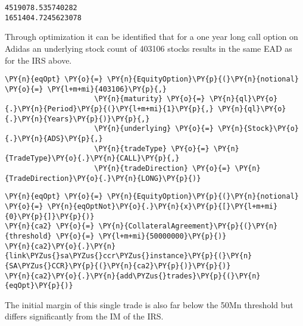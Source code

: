     \begin{Verbatim}[commandchars=\\\{\}]
4519078.535740282
1651404.7245623078
    \end{Verbatim}

    Through optimization it can be identified that for a one year long call
option on Adidas an underlying stock count of 403106 stocks results in
the same EAD as for the IRS above.

    
    \begin{tcolorbox}[breakable, size=fbox, boxrule=1pt, pad at break*=1mm,colback=cellbackground, colframe=cellborder]
\begin{Verbatim}[commandchars=\\\{\}]
\PY{n}{eqOpt} \PY{o}{=} \PY{n}{EquityOption}\PY{p}{(}\PY{n}{notional} \PY{o}{=} \PY{l+m+mi}{403106}\PY{p}{,}
                     \PY{n}{maturity} \PY{o}{=} \PY{n}{ql}\PY{o}{.}\PY{n}{Period}\PY{p}{(}\PY{l+m+mi}{1}\PY{p}{,} \PY{n}{ql}\PY{o}{.}\PY{n}{Years}\PY{p}{)}\PY{p}{,}
                     \PY{n}{underlying} \PY{o}{=} \PY{n}{Stock}\PY{o}{.}\PY{n}{ADS}\PY{p}{,}
                     \PY{n}{tradeType} \PY{o}{=} \PY{n}{TradeType}\PY{o}{.}\PY{n}{CALL}\PY{p}{,}
                     \PY{n}{tradeDirection} \PY{o}{=} \PY{n}{TradeDirection}\PY{o}{.}\PY{n}{LONG}\PY{p}{)}
\end{Verbatim}
\end{tcolorbox}

    \begin{tcolorbox}[breakable, size=fbox, boxrule=1pt, pad at break*=1mm,colback=cellbackground, colframe=cellborder]
\begin{Verbatim}[commandchars=\\\{\}]
\PY{n}{eqOpt} \PY{o}{=} \PY{n}{EquityOption}\PY{p}{(}\PY{n}{notional} \PY{o}{=} \PY{n}{eqOptNot}\PY{o}{.}\PY{n}{x}\PY{p}{[}\PY{l+m+mi}{0}\PY{p}{]}\PY{p}{)}
\PY{n}{ca2} \PY{o}{=} \PY{n}{CollateralAgreement}\PY{p}{(}\PY{n}{threshold} \PY{o}{=} \PY{l+m+mi}{50000000}\PY{p}{)}
\PY{n}{ca2}\PY{o}{.}\PY{n}{link\PYZus{}sa\PYZus{}ccr\PYZus{}instance}\PY{p}{(}\PY{n}{SA\PYZus{}CCR}\PY{p}{(}\PY{n}{ca2}\PY{p}{)}\PY{p}{)}
\PY{n}{ca2}\PY{o}{.}\PY{n}{add\PYZus{}trades}\PY{p}{(}\PY{n}{eqOpt}\PY{p}{)}
\end{Verbatim}
\end{tcolorbox}

    The initial margin of this single trade is also far below the 50Mn
threshold but differs significantly from the IM of the IRS.

